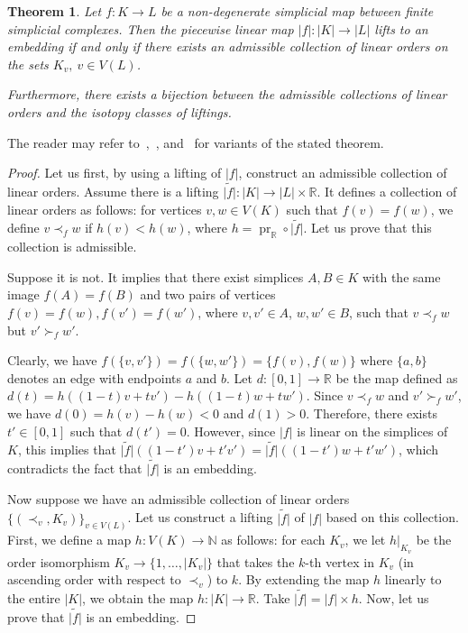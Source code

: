\documentclass[a4paper,12pt,reqno,oneside]{amsart}
\theoremstyle{plain}
\newtheorem{theorem}{Theorem}
\theoremstyle{definition}
\theoremstyle{plain}
\newcommand{\from}{\colon}
\newcommand{\wt}[1]{\widetilde{#1}}
\newcommand{\R}{\mathbb{R}}
\newcommand{\N}{\mathbb{N}}
\DeclareMathOperator{\pr}{pr}
\begin{document}
\begin{theorem}\label{thm:orders}
  Let $f \from K \to L$ be a non-degenerate simplicial map between finite simplicial complexes. Then
  the piecewise linear map $|f| \from |K| \to |L|$ lifts to an embedding if and only if there exists an
  admissible collection of linear orders on the sets $K_v,\ v \in V(L)$.

  Furthermore, there exists a bijection between the admissible collections of linear orders and the
  isotopy classes of liftings.
\end{theorem}

The reader may refer to~\cite[Proposition 4]{giller},~\cite[Lemme 1.4]{poen_fr}, and~\cite[Theorem
5]{mel2} for variants of the stated theorem.

\begin{proof}
  Let us first, by using a lifting of $|f|$, construct an admissible collection of linear
  orders. Assume there is a lifting $\wt{|f|} \from |K| \to |L| \times \R$. It defines a collection
  of linear orders as follows: for vertices $v, w \in V(K)$ such that $f(v) = f(w)$, we define
  $v \prec_f w$ if $h(v) < h(w)$, where $h = \pr_\R \circ \wt{|f|}$. Let us prove that this
  collection is admissible.

  Suppose it is not. It implies that there exist simplices $A, B \in K$ with the same image $f(A) =
  f(B)$ and two pairs of vertices $f(v) = f(w), f(v') = f(w')$, where $v, v' \in A$, $w, w' \in B$,
  such that $v \prec_f w$ but $v' \succ_f w'$.

  Clearly, we have $f(\{v, v'\}) = f(\{w, w'\}) = \{f(v), f(w)\}$ where $\{a, b\}$ denotes an edge
  with endpoints $a$ and $b$. Let $d \from [0, 1] \to \R$ be the map defined as
  $d(t) = h((1-t) v + t v') - h((1-t) w + t w')$. Since $v \prec_f w$ and $v' \succ_f w'$, we have
  $d(0) = h(v) - h(w) < 0$ and $d(1) > 0$. Therefore, there exists $t' \in [0, 1]$ such that
  $d(t') = 0$. However, since $|f|$ is linear on the simplices of $K$, this implies that
  $\wt{|f|}((1-t')v + t'v') = \wt{|f|}((1-t')w + t'w')$, which contradicts the fact that $\wt{|f|}$
  is an embedding.

  Now suppose we have an admissible collection of linear orders $\{ (\prec_v, K_v) \}_{v \in
    V(L)}$. Let us construct a lifting $\wt{|f|}$ of $|f|$ based on this collection. First, we define a map
  $h \from V(K) \to \N$ as follows: for each $K_v$, we let $h\big|_{K_v}$ be the order isomorphism
  $K_v \to \{1, \dots, |K_v|\}$ that takes the $k$-th vertex in $K_v$ (in ascending order with respect
  to $\prec_v$) to $k$. By extending the map $h$ linearly to the entire $|K|$, we obtain the map
  $h \from |K| \to \R$. Take $\wt{|f|} = |f| \times h$. Now, let us prove that $\wt{|f|}$ is an embedding.


\end{proof}
\end{document}
